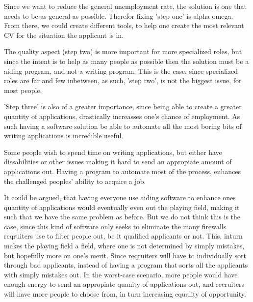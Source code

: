 Since we want to reduce the general unemployment rate, the solution is one that needs to 
be as general as possible. Therefor fixing 'step one' is alpha omega.
From there, we could create different tools, to help one create the most relevant
CV for the situation the applicant is in.

The quality aspect (step two) is more important for more specialized roles, 
but since the intent is to help as many people as possible then the solution
must be a aiding program, and not a writing program.
This is the case, since specialized roles are far and few inbetween,
as such, 'step two', is not the biggest issue, for most people. 

'Step three' is also of a greater importance, since being able to create a
greater quantity of applications, drastically increasses one's chance of
employment. 
As such having a software solution be able to automate all the most boring
bits of writing applications is incredible useful.

Some people wish to spend time on writing applications, but either have
dissabilities or other issues making it hard to send an appropiate amount
of applications out. Having a program to automate most of the process, enhances
the challenged peoples' ability to acquire a job.

It could be argued, that having everyone use aiding software to enhance ones
quantity of applications would eventually even out the playing field, making
it such that we have the same problem as before. 
But we do not think this is the case, since this kind of software only seeks
to eliminate the many firewalls reqruiters use to filter people out, be it 
qualified applicants or not.
This, inturn makes the playing field a field, where one is not determined by
simply mistakes, but hopefully more on one's merit. Since reqruiters will have to 
individually sort through bad applicants, instead of having a program that sorts
all the applicants with simply mistakes out. In the worst-case scenario, more
people would have enough energy to send an appropiate quanity of applications
out, and recruiters will have more people to choose from, in turn increasing
equality of opportunity.

